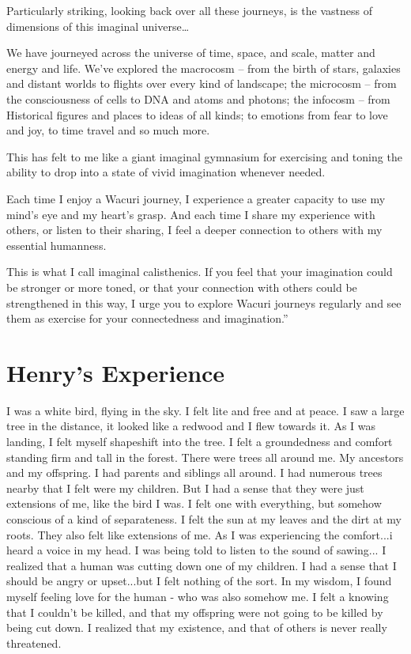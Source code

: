 \documentclass[12pt]{book}
\begin{document}
Particularly striking, looking back over all these journeys, is the
vastness of dimensions of this imaginal universe…

We have journeyed across the universe of time, space, and scale,
matter and energy and life. We've explored the macrocosm – from the
birth of stars, galaxies and distant worlds to flights over every kind
of landscape; the microcosm – from the consciousness of cells to DNA
and atoms and photons; the infocosm – from Historical figures and
places to ideas of all kinds; to emotions from fear to love and joy,
to time travel and so much more.

This has felt to me like a giant imaginal gymnasium for exercising and
toning the ability to drop into a state of vivid imagination whenever
needed.

Each time I enjoy a Wacuri journey, I experience a greater capacity to
use my mind’s eye and my heart’s grasp. And each time I share my
experience with others, or listen to their sharing, I feel a deeper
connection to others with my essential humanness.

This is what I call imaginal calisthenics. If you feel that your
imagination could be stronger or more toned, or that your connection
with others could be strengthened in this way, I urge you to explore
Wacuri journeys regularly and see them as exercise for your
connectedness and imagination.''


\section{Henry's Experience}

I was a white bird, flying in the sky. I felt lite and free and at
peace. I saw a large tree in the distance, it looked like a redwood
and I flew towards it. As I was landing, I felt myself shapeshift into
the tree. I felt a groundedness and comfort standing firm and tall in
the forest. There were trees all around me. My ancestors and my
offspring. I had parents and siblings all around. I had numerous trees
nearby that I felt were my children. But I had a sense that they were
just extensions of me, like the bird I was. I felt one with
everything, but somehow conscious of a kind of separateness. I felt
the sun at my leaves and the dirt at my roots. They also felt like
extensions of me. As I was experiencing the comfort...i heard a voice
in my head. I was being told to listen to the sound of sawing... I
realized that a human was cutting down one of my children. I had a
sense that I should be angry or upset...but I felt nothing of the
sort. In my wisdom, I found myself feeling love for the human - who
was also somehow me. I felt a knowing that I couldn't be killed, and
that my offspring were not going to be killed by being cut down. I
realized that my existence, and that of others is never really
threatened.
\end{document}
